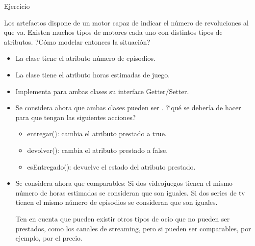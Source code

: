 \documentclass[10pt, envcountsect , spanish]{beamer}
\begin{document}
\begin{frame}{Ejercicio} 
\small


\begin{ejercicio}{}
Los artefactos dispone de un motor capaz de indicar el número de revoluciones al que va.
Existen muchos tipos de motores cada uno con distintos tipos de atributos. ?Cómo modelar entonces la situación?
\end{ejercicio}




\begin{ejercicio}{}
\begin{itemize}\setlength{\itemsep}{0em}
\item La clase  tiene  el atributo número de episodios.
\item  La clase  tiene  el atributo horas estimadas de juego.
\item Implementa para ambas clases su interface Getter/Setter.

\item Se considera ahora que ambas clases  pueden ser .
?`qué se debería de hacer para que  tengan las siguientes acciones?

\begin{itemize} \setlength{\itemsep}{0em}
\item entregar(): cambia el atributo prestado a true.
\item devolver(): cambia el atributo prestado a false.
\item esEntregado(): devuelve el estado del atributo prestado.
\end{itemize}

\item Se considera ahora que  comparables: Si dos videojuegos tienen el mismo número de horas estimadas se consideran que son iguales.
Si dos series de tv tienen el mismo número de episodios se consideran que son iguales.

Ten en cuenta que pueden existir otros tipos de ocio que no pueden ser prestados, como los canales de streaming, pero si pueden ser comparables, por ejemplo, por el precio.
\end{itemize}

\end{ejercicio}

\end{frame}
\end{document}
